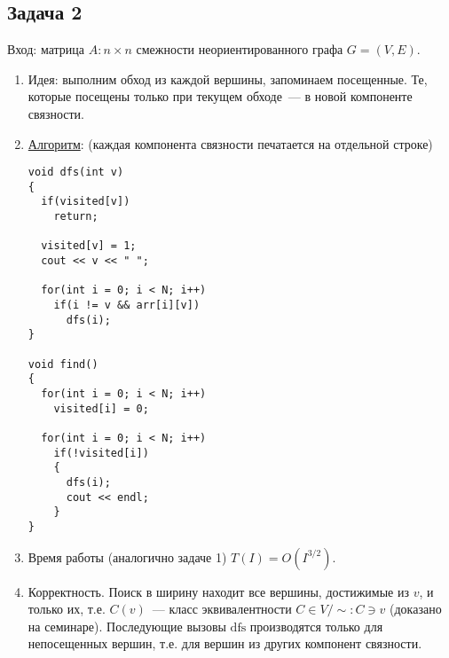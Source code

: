 \documentclass[a4paper]{article}
\begin{document}
\subsection*{Задача 2}
Вход: матрица $A\colon n\times n$ смежности неориентированного графа $G=(V,E)$.
\begin{enumerate}
\item Идея: выполним обход из каждой вершины, запоминаем посещенные. Те, которые посещены только при текущем обходе~--- в новой компоненте связности.
\item \href{https://bitbucket.org/etoestja/inf/raw/HEAD/mipt/s4/AACM/C/R2/main.cpp}{Алгоритм}: (каждая компонента связности печатается на отдельной строке)
\begin{lstlisting}
void dfs(int v)
{
  if(visited[v])
    return;

  visited[v] = 1;
  cout << v << " ";

  for(int i = 0; i < N; i++)
    if(i != v && arr[i][v])
      dfs(i);
}

void find()
{
  for(int i = 0; i < N; i++)
    visited[i] = 0;

  for(int i = 0; i < N; i++)
    if(!visited[i])
    {
      dfs(i);
      cout << endl;
    }
}
\end{lstlisting}
\item Время работы (аналогично задаче 1) $T(I)=O(I^{3/2})$.
\item Корректность. Поиск в ширину находит все вершины, достижимые из $v$, и только их, т.е. $C(v)$~--- класс эквивалентности $C\in V/\sim\colon C\ni v$ (доказано на семинаре). Последующие вызовы $\mbox{dfs}$ производятся только для непосещенных вершин, т.е. для вершин из других компонент связности.
\end{enumerate}
\end{document}
